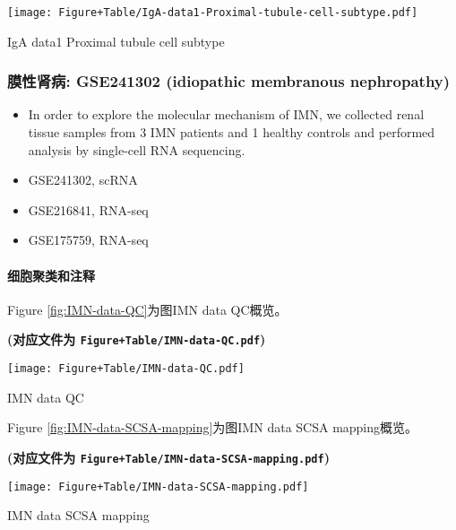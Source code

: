 \documentclass[
]{article}
\begin{document}
\def\@captype{figure}
\begin{center}
\texttt{[image: Figure+Table/IgA-data1-Proximal-tubule-cell-subtype.pdf]}
\caption{IgA data1 Proximal tubule cell subtype}\label{fig:IgA-data1-Proximal-tubule-cell-subtype}
\end{center}

\hypertarget{ux819cux6027ux80beux75c5-gse241302-idiopathic-membranous-nephropathy}{%
\subsubsection{膜性肾病: GSE241302 (idiopathic membranous nephropathy)}\label{ux819cux6027ux80beux75c5-gse241302-idiopathic-membranous-nephropathy}}

\begin{itemize}
\item
  In order to explore the molecular mechanism of IMN, we collected renal tissue
  samples from 3 IMN patients and 1 healthy controls and performed analysis by
  single-cell RNA sequencing.
\item
  GSE241302, scRNA
\item
  GSE216841, RNA-seq
\item
  GSE175759, RNA-seq
\end{itemize}

\hypertarget{ux7ec6ux80deux805aux7c7bux548cux6ce8ux91ca-3}{%
\paragraph{细胞聚类和注释}\label{ux7ec6ux80deux805aux7c7bux548cux6ce8ux91ca-3}}

Figure \ref{fig:IMN-data-QC}为图IMN data QC概览。

\textbf{(对应文件为 \texttt{Figure+Table/IMN-data-QC.pdf})}

\def\@captype{figure}
\begin{center}
\texttt{[image: Figure+Table/IMN-data-QC.pdf]}
\caption{IMN data QC}\label{fig:IMN-data-QC}
\end{center}

Figure \ref{fig:IMN-data-SCSA-mapping}为图IMN data SCSA mapping概览。

\textbf{(对应文件为 \texttt{Figure+Table/IMN-data-SCSA-mapping.pdf})}

\def\@captype{figure}
\begin{center}
\texttt{[image: Figure+Table/IMN-data-SCSA-mapping.pdf]}
\caption{IMN data SCSA mapping}\label{fig:IMN-data-SCSA-mapping}
\end{center}
\end{document}
